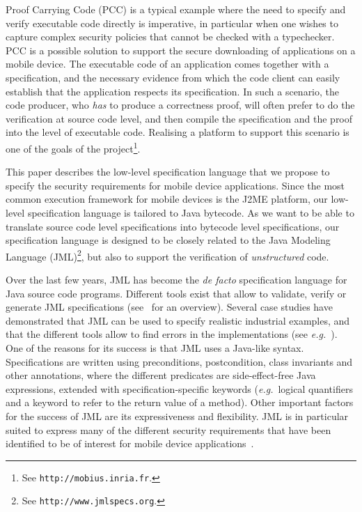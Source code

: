 Proof Carrying Code (PCC) is a typical example where the need to
specify and verify executable code directly is imperative, in
particular when one wishes to capture complex security policies that
cannot be checked with a typechecker.  PCC is a possible solution to
support the secure downloading of applications on a mobile device. The
executable code of an application comes together with a specification,
and the necessary evidence from which the code client can easily
establish that the application respects its specification. In such a
scenario, the code producer, who \emph{has} to produce a correctness
proof, will often prefer to do the verification at source code level,
and then compile the specification and the proof into the level of
executable code. Realising a platform to support this scenario is one
of the goals of the \mobius project\footnote{See
\texttt{http://mobius.inria.fr}.}. 

This paper describes the low-level specification language that we
propose to specify the security requirements for mobile device
applications. Since the most common execution framework for mobile
devices is the J2ME platform, our low-level specification language is
tailored to Java bytecode. As we want to be able to translate
source code level specifications into bytecode level specifications,
our specification language is designed to be closely related
to the Java Modeling Language (JML)\footnote{See
\texttt{http://www.jmlspecs.org}.}, but also to support the verification of
\emph{unstructured} code. 


Over the last few years, JML has become the \emph{de facto}
specification language for Java source code programs. Different tools
exist that allow to validate, verify or generate JML specifications
(see~\cite{BurdyCCEKLLP05} for an overview). Several case studies have
demonstrated that JML can be used to specify realistic industrial
examples, and that the different tools allow to find errors in the
implementations (see \emph{e.g.}~\cite{BreunesseCHJ04}). One of the
reasons for its success is that JML uses a Java-like
syntax. Specifications are written using preconditions, postcondition,
class invariants and other annotations, where the different predicates
are side-effect-free Java expressions, extended with
specification-specific keywords (\emph{e.g.}\ logical quantifiers and
a keyword to refer to the return value of a method). Other important
factors for the success of JML are its expressiveness and
flexibility. JML is in particular suited to express many of the
different security requirements that have been identified to be of
interest for mobile device applications~\cite{Deliverable1.2}.


